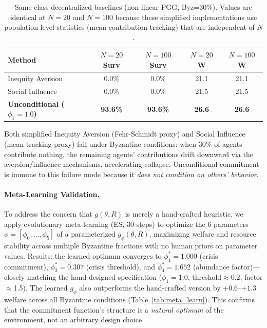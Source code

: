 \documentclass{article}
\begin{document}
\begin{table}[t]
\centering
\caption{Same-class decentralized baselines (non-linear PGG, Byz=30\%). Values are identical at $N{=}20$ and $N{=}100$ because these simplified implementations use population-level statistics (mean contribution tracking) that are independent of $N$.}
\label{tab:baselines}
\begin{tabular}{lcccc}
\toprule
\textbf{Method} & \textbf{$N{=}20$ Surv} & \textbf{$N{=}100$ Surv} & \textbf{$N{=}20$ W} & \textbf{$N{=}100$ W} \\
\midrule
Inequity Aversion & 0.0\% & 0.0\% & 21.1 & 21.1 \\
Social Influence & 0.0\% & 0.0\% & 21.5 & 21.5 \\
\midrule
\textbf{Unconditional ($\phi_1{=}1.0$)} & \textbf{93.6\%} & \textbf{93.6\%} & \textbf{26.6} & \textbf{26.6} \\
\bottomrule
\end{tabular}
\end{table}

\noindent Both simplified Inequity Aversion (Fehr-Schmidt proxy) and Social Influence (mean-tracking proxy) fail under Byzantine conditions: when 30\% of agents contribute nothing, the remaining agents' contributions drift downward via the aversion/influence mechanisms, accelerating collapse.
Unconditional commitment is immune to this failure mode because it \emph{does not condition on others' behavior}.

\paragraph{Meta-Learning Validation.}
To address the concern that $g(\theta, R)$ is merely a hand-crafted heuristic, we apply evolutionary meta-learning (ES, 30 steps) to optimize the 6 parameters $\phi = [\phi_0, \ldots, \phi_5]$ of a parameterized $g_\phi(\theta, R)$, maximizing welfare and resource stability across multiple Byzantine fractions with no human priors on parameter values.
Results: the learned optimum converges to $\phi_1^* = 1.000$ (crisis commitment), $\phi_3^* = 0.307$ (crisis threshold), and $\phi_4^* = 1.652$ (abundance factor)---closely matching the hand-designed specification ($\phi_1{=}1.0$, threshold$\approx$0.2, factor$\approx$1.5).
The learned $g_\phi$ also outperforms the hand-crafted version by $+0.6$--$+1.3$ welfare across all Byzantine conditions (Table~\ref{tab:meta_learn}).
This confirms that the commitment function's structure is a \emph{natural optimum} of the environment, not an arbitrary design choice.
\end{document}
